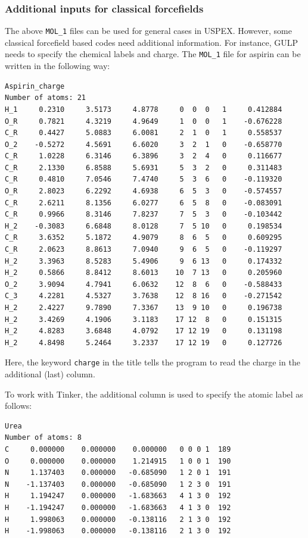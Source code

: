 \documentclass[12pt]{article}
\newcommand{\keyword}[1]{\texttt{#1}}
\newcommand{\file}[1]{\texttt{#1}}
\begin{document}
\subsubsection{Additional inputs for classical forcefields}

The above \file{MOL\_1} files can be used for general cases in USPEX. However,
some classical forcefield based codes need additional information. For instance,
GULP needs to specify the chemical labels and charge. The \file{MOL\_1} file for
aspirin can be written in the following way:
\begin{verbatim}
Aspirin_charge
Number of atoms: 21
H_1     0.2310     3.5173     4.8778     0  0  0   1     0.412884
O_R     0.7821     4.3219     4.9649     1  0  0   1    -0.676228
C_R     0.4427     5.0883     6.0081     2  1  0   1     0.558537
O_2    -0.5272     4.5691     6.6020     3  2  1   0    -0.658770
C_R     1.0228     6.3146     6.3896     3  2  4   0     0.116677
C_R     2.1330     6.8588     5.6931     5  3  2   0     0.311483
C_R     0.4810     7.0546     7.4740     5  3  6   0    -0.119320
O_R     2.8023     6.2292     4.6938     6  5  3   0    -0.574557
C_R     2.6211     8.1356     6.0277     6  5  8   0    -0.083091
C_R     0.9966     8.3146     7.8237     7  5  3   0    -0.103442
H_2    -0.3083     6.6848     8.0128     7  5 10   0     0.198534
C_R     3.6352     5.1872     4.9079     8  6  5   0     0.609295
C_R     2.0623     8.8613     7.0940     9  6  5   0    -0.119297
H_2     3.3963     8.5283     5.4906     9  6 13   0     0.174332
H_2     0.5866     8.8412     8.6013    10  7 13   0     0.205960
O_2     3.9094     4.7941     6.0632    12  8  6   0    -0.588433
C_3     4.2281     4.5327     3.7638    12  8 16   0    -0.271542
H_2     2.4227     9.7890     7.3367    13  9 10   0     0.196738
H_2     3.4269     4.1906     3.1183    17 12  8   0     0.151315
H_2     4.8283     3.6848     4.0792    17 12 19   0     0.131198
H_2     4.8498     5.2464     3.2337    17 12 19   0     0.127726
\end{verbatim}
Here, the keyword \keyword{charge} in the title tells the program to read the 
charge in the additional (last) column.

To work with Tinker, the additional column is used to specify the atomic label
as follows:
\begin{verbatim}
Urea
Number of atoms: 8
C     0.000000    0.000000    0.000000   0 0 0 1  189  
O     0.000000    0.000000    1.214915   1 0 0 1  190  
N     1.137403    0.000000   -0.685090   1 2 0 1  191  
N    -1.137403    0.000000   -0.685090   1 2 3 0  191  
H     1.194247    0.000000   -1.683663   4 1 3 0  192  
H    -1.194247    0.000000   -1.683663   4 1 3 0  192  
H     1.998063    0.000000   -0.138116   2 1 3 0  192  
H    -1.998063    0.000000   -0.138116   2 1 3 0  192  
\end{verbatim}
\end{document}
